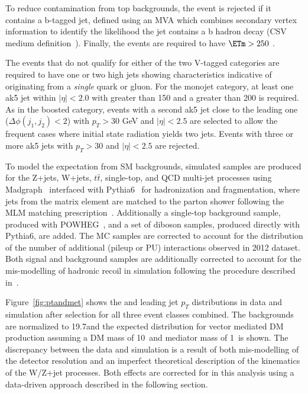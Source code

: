 To reduce contamination from top backgrounds, the event is rejected if it
contains a b-tagged jet, defined using an MVA which combines secondary vertex
information to identify the likelihood the jet contains a b hadron decay (CSV
medium definition~\cite{BTAG}). Finally, the events are required to have
$\ETm>250$ \gev. 

The events that do not qualify for either of the two V-tagged categories are
required to have one or two high \pt jets showing characteristics indicative of
originating from a \emph{single} quark or gluon.  For the monojet category, at
least one ak5 jet within $|\eta|<2.0$ with \pt greater than 150 \gev and a \ETm
greater than 200 \gev is required.  As in the boosted category, events with a
second ak5 jet close to the leading one ($\Delta\phi(j_1,j_2) < 2$) with
$p_T>30$ GeV and $|\eta|<2.5$ are selected to allow the frequent cases where
initial state radiation yields two jets.  Events with three or more ak5 jets
with $p_T>30$ \gev and $|\eta|<2.5$ are rejected.

To model the expectation from SM backgrounds, simulated samples are produced for
the Z+jets, W+jets, $t\bar{t}$, single-top, and QCD multi-jet processes using
Madgraph~\cite{amcatnlo} interfaced with Pythia6~\cite{Sjostrand:2006za} for
hadronization and fragmentation, where jets from the matrix element are matched
to the parton shower following the MLM matching
prescription~\cite{Mangano:2006rw}.  Additionally a single-top background
sample, produced with POWHEG~\cite{powheg}, and a set of diboson samples,
produced directly with Pythia6, are added.  The MC samples are corrected to
account for the distribution of the number of additional (pileup or PU)
interactions observed in 2012 dataset. Both signal and background samples are
additionally corrected to account for the mis-modelling of hadronic recoil in
simulation following the procedure described in~\cite{CMS-PAS-JME-12-002}.


Figure~\ref{fig:ptandmet} shows the \ETm and leading jet $p_{T}$ distributions
in data and simulation after selection for all three event classes combined. The
backgrounds are normalized to 19.7\fbinv and the expected distribution for
vector mediated DM production assuming a DM mass of 10~\GeV and mediator mass of
1~\TeV is shown.  The discrepancy between the data and simulation is a result of
both mis-modelling of the detector resolution and an imperfect theoretical
description of the kinematics of the W/Z+jet processes.  Both effects are
corrected for in this analysis using a data-driven approach described in the
following section. 

